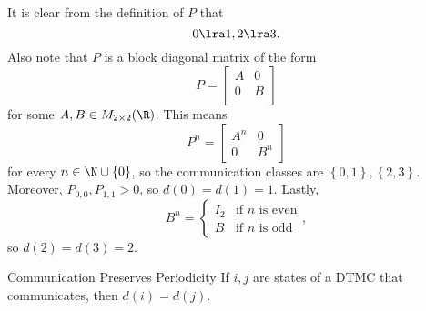\documentclass[stat333]{subfiles}
\begin{document}
    \begin{subproof}[Answer]
        It is clear from the definition of $P$ that
        \begin{equation*}
            0\lra 1, 2\lra 3.
        \end{equation*}
        Also note that $P$ is a block diagonal matrix of the form
        \begin{equation*}
            P =
            \begin{bmatrix}
            	A & 0 \\
            	0 & B \\
            \end{bmatrix}
        \end{equation*}
        for some $A,B\in M_{2\times 2}(\R)$. This means
        \begin{equation*}
            P^n = 
            \begin{bmatrix} 
                A^n & 0 \\
                0 & B^n
            \end{bmatrix}
        \end{equation*}
        for every $n\in\N\cup\left\lbrace 0 \right\rbrace$, so the communication classes are $\left\lbrace 0,1 \right\rbrace, \left\lbrace 2,3 \right\rbrace$. Moreover, $P_{0,0}, P_{1,1}>0$, so $d\left( 0 \right)=d\left( 1 \right)=1$. Lastly, 
        \begin{equation*}
            B^n = 
            \begin{cases} 
                I_2 & \text{if $n$ is even}\\
                B & \text{if $n$ is odd}
            \end{cases},
        \end{equation*}
        so $d\left( 2 \right)=d\left( 3 \right)=2$.
    \end{subproof}

    \begin{prop}{Communication Preserves Periodicity}
        If $i,j$ are states of a DTMC that communicates, then $d\left( i \right)=d\left( j \right)$.
    \end{prop}
\end{document}
